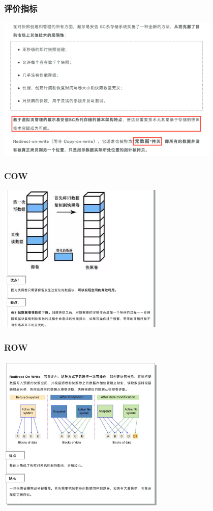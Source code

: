 \documentclass[UTF8,8pt,xcolor=dvipsnames]{beamer}
\begin{document}
\begin{frame}[fragile]
    \frametitle{评价指标}
    \begin{center}
        \includegraphics[width=0.8\textwidth]{../imgs/row-indexes.png}
    \end{center}
\end{frame}

\begin{frame}[fragile]
    \frametitle{COW}
    \begin{center}
        \includegraphics[width=0.6\textwidth]{../imgs/cow-snapshot.png}
    \end{center}
\end{frame}

\begin{frame}[fragile]
    \frametitle{ROW}
    \begin{center}
        \includegraphics[width=0.6\textwidth]{../imgs/row-snapshot.png}
    \end{center}
\end{frame}
\end{document}
